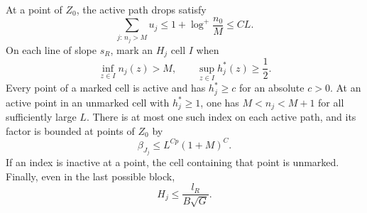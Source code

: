 \begin{lemma}
\label{hier:marking}
At a point of $Z_0$, the active path drops satisfy
\begin{equation}
 \sum_{j:\,n_j>M}u_j
 \le 1+\log^+\frac{n_0}{M}\le C L.
 \label{hier:drop-budget}
\end{equation}
On each line of slope $s_R$, mark an $H_j$ cell $I$ when
\begin{equation}
 \inf_{z\in I}n_j(z)>M,
 \qquad
 \sup_{z\in I}h_j^*(z)\ge\frac12.
 \label{eq:src-23}
\end{equation}
Every point of a marked cell is active and has $h_j^*\ge c$ for an
absolute $c>0$.  At an active point in an unmarked cell with
$h_j^*\ge1$, one has $M<n_j<M+1$ for all sufficiently large $L$.
There is at most one such index on each active path, and its factor is
bounded at points of $Z_0$ by
\begin{equation}
 \beta_{J_j}\le L^{Cp}(1+M)^C.
 \label{hier:missing-factor}
\end{equation}
If an index is inactive at a point, the cell containing that point is
unmarked.  Finally, even in the last possible block,
\begin{equation}
 H_j\le\frac{l_R}{B\sqrt G}.
 \label{hier:mesh-within-top}
\end{equation}
\end{lemma}

